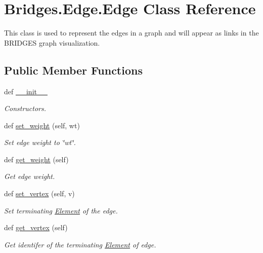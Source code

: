 \hypertarget{class_bridges_1_1_edge_1_1_edge}{}\section{Bridges.\+Edge.\+Edge Class Reference}
\label{class_bridges_1_1_edge_1_1_edge}


This class is used to represent the edges in a graph and will appear as links in the B\+R\+I\+D\+G\+E\+S graph visualization.  


\subsection*{Public Member Functions}
\begin{DoxyCompactItemize}
\item 
def \hyperlink{class_bridges_1_1_edge_1_1_edge_a99af9fe7a8c552f4640498c24df04f36}{\+\_\+\+\_\+init\+\_\+\+\_\+}
\begin{DoxyCompactList}\small\item\em Constructors. \end{DoxyCompactList}\item 
def \hyperlink{class_bridges_1_1_edge_1_1_edge_ac56a88d2be2c306f4b92e35923610d88}{set\+\_\+weight} (self, wt)
\begin{DoxyCompactList}\small\item\em Set edge weight to \char`\"{}wt\char`\"{}. \end{DoxyCompactList}\item 
def \hyperlink{class_bridges_1_1_edge_1_1_edge_ae1279ba60e0fa7312c1185a3cbfe8a39}{get\+\_\+weight} (self)
\begin{DoxyCompactList}\small\item\em Get edge weight. \end{DoxyCompactList}\item 
def \hyperlink{class_bridges_1_1_edge_1_1_edge_a2f96320e42e68653ead6ea4ef85a77ac}{set\+\_\+vertex} (self, v)
\begin{DoxyCompactList}\small\item\em Set terminating \hyperlink{namespace_bridges_1_1_element}{Element} of the edge. \end{DoxyCompactList}\item 
def \hyperlink{class_bridges_1_1_edge_1_1_edge_a18be7a83a15e5d9d0f49cb8226dddde0}{get\+\_\+vertex} (self)
\begin{DoxyCompactList}\small\item\em Get identifer of the terminating \hyperlink{namespace_bridges_1_1_element}{Element} of edge. \end{DoxyCompactList}\item 

\end{DoxyCompactItemize}
